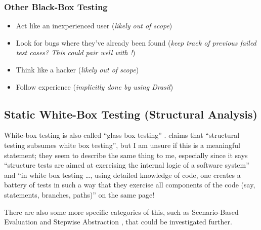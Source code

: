 \subsubsection{Other Black-Box Testing \citep[pp.~87-89]{Patton2006}}
\begin{itemize}
      \item Act like an inexperienced user (\emph{likely out of scope})
      \item Look for bugs where they've already been found (\emph{keep track of
                  previous failed test cases? This could pair well with
                  !})
      \item Think like a hacker (\emph{likely out of scope})
      \item Follow experience (\emph{implicitly done by using Drasil})
\end{itemize}

\subsection{Static White-Box Testing (Structural Analysis)
      \citep[pp.~91-104]{Patton2006}}

White-box testing is also called ``glass box testing''
\citep[p.~439]{PetersAndPedrycz2000}. \citep[p.~447]{PetersAndPedrycz2000} claims
that ``structural testing subsumes white box testing'', but I am unsure if this
is a meaningful statement; they seem to describe the same thing to me, 
especially since it says ``structure tests are aimed at exercising the internal
logic of a software system'' and ``in white box testing \dots, using detailed
knowledge of code, one creates a battery of tests in such a way that they
exercise all components of the code (say, statements, branches, paths)'' on the
same page!

There are also some more specific
categories of this, such as Scenario-Based
Evaluation \citep[pp.~417-418]{vanVliet2000} and Stepwise Abstraction
\citep[pp.~419-420]{vanVliet2000}, that could be investigated further.


